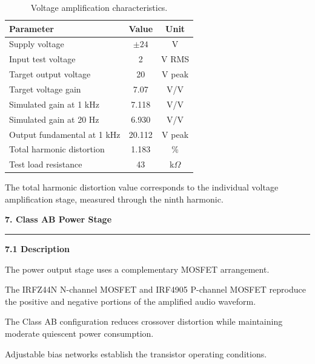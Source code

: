 \documentclass[10pt,letterpaper]{article}
\newcommand{\datasheetsection}[1]{
    \vspace{0.3cm}
    {\large\bfseries\color{datasheetblue}#1}
    \par\vspace{0.1cm}
    \hrule
    \vspace{0.15cm}
}
\newcommand{\datasheetsubsection}[1]{
    \vspace{0.15cm}
    {\normalsize\bfseries\color{datasheetblue}#1}
    \par
}
\begin{document}
\begin{table}[htbp]
\centering
\small

\begin{tabular}{p{7cm}cc}
\hline
Parameter & Value & Unit\\
\hline

Supply voltage & $\pm24$ & V\\

Input test voltage & 2 & V RMS\\

Target output voltage & 20 & V peak\\

Target voltage gain & 7.07 & V/V\\

Simulated gain at 1 kHz & 7.118 & V/V\\

Simulated gain at 20 Hz & 6.930 & V/V\\

Output fundamental at 1 kHz & 20.112 & V peak\\

Total harmonic distortion & 1.183 & \%\\

Test load resistance & 43 & k$\Omega$\\

\hline
\end{tabular}

\caption{Voltage amplification characteristics.}
\end{table}

The total harmonic distortion value
corresponds to the individual
voltage amplification stage,
measured through the ninth harmonic.

\datasheetsection{7. Class AB Power Stage}

\datasheetsubsection{7.1 Description}

The power output stage uses
a complementary MOSFET arrangement.

The IRFZ44N N-channel MOSFET and
IRF4905 P-channel MOSFET reproduce
the positive and negative portions
of the amplified audio waveform.

The Class AB configuration reduces
crossover distortion while maintaining
moderate quiescent power consumption.

Adjustable bias networks establish
the transistor operating conditions.
\end{document}

